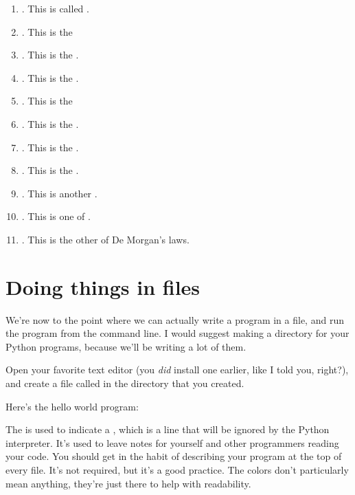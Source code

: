 \begin{enumerate}
\item {}. This is called .
\item {}. This is the
\item {}. This is the .
\item {}. This is the .
\item {}. This is the
\item {}. This is the .
\item {}. This is the .
\item {}. This is the
  .
\item {}. This is another
  .
\item {}. This is one of
  .
\item {}. This is the other of
  De Morgan's laws.
\end{enumerate}

\section{Doing things in files}

We're now to the point where we can actually write a program in a
file, and run the program from the command line. I would suggest
making a directory for your Python programs, because we'll be writing
a lot of them.

Open your favorite text editor (you \emph{did} install one earlier,
like I told you, right?), and create a file called  in
the directory that you created.

Here's the hello world program:


The \code{#} is used to indicate a , which is a line
that will be ignored by the Python interpreter. It's used to leave
notes for yourself and other programmers reading your code. You should
get in the habit of describing your program at the top of every
file. It's not required, but it's a good practice. The colors don't
particularly mean anything, they're just there to help with
readability.

